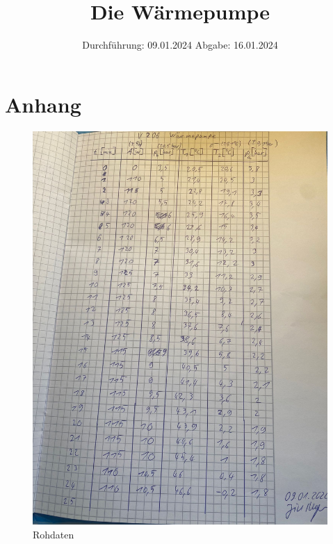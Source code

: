 

\subject{V206}
\title{Die Wärmepumpe}
\date{%
  Durchführung: 09.01.2024
  \hspace{3em}
  Abgabe: 16.01.2024
}



\maketitle
\thispagestyle{empty}
\tableofcontents
\newpage






\printbibliography{}

\section{Anhang}
\begin{figure}[H]
  \caption{Rohdaten}
  \includegraphics[height=15cm]{Bilder/data.jpg}
\end{figure}




